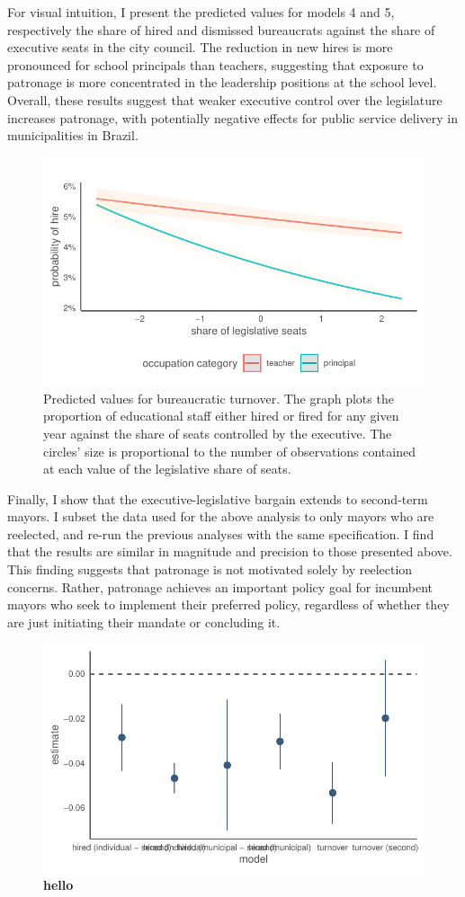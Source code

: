 \documentclass[12pt,a4paper]{article}
\begin{document}
For visual intuition, I present the predicted values for models 4 and 5, respectively the share of hired and dismissed bureaucrats against the share of executive seats in the city council. The reduction in new hires is more pronounced for school principals than teachers, suggesting that exposure to patronage is more concentrated in the leadership positions at the school level. Overall, these results suggest that weaker executive control over the legislature increases patronage, with potentially negative effects for public service delivery in municipalities in Brazil.

\begin{figure}[h]
    \centering
    \includegraphics[width=0.6\linewidth]{plots/plot_interactions_logit}
    \caption{Predicted values for bureaucratic turnover. The graph plots the proportion of educational staff either hired or fired for any given year against the share of seats controlled by the executive. The circles' size is proportional to the number of observations contained at each value of the legislative share of seats.}
    \label{fig:turnover}
\end{figure}

Finally, I show that the executive-legislative bargain extends to second-term mayors. I subset the data used for the above analysis to only mayors who are reelected, and re-run the previous analyses with the same specification. I find that the results are similar in magnitude and precision to those presented above. This finding suggests that patronage is not motivated solely by reelection concerns. Rather, patronage achieves an important policy goal for incumbent mayors who seek to implement their preferred policy, regardless of whether they are just initiating their mandate or concluding it.

\begin{figure}[h]
    \centering
    \includegraphics[width=0.6\linewidth]{plots/plot_coalition_coef_mun_second.pdf}
    \caption{\bf{hello}}
\end{figure}
\end{document}
